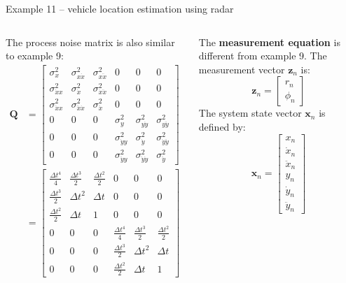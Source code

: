 \begin{frame}{Example 11 – vehicle location estimation using radar}
\begin{columns}
The process noise matrix is also similar to example 9:
\begin{align*}
\mathbf{Q} & =
\begin{bmatrix}
\sigma^2_{x} & \sigma^2_{x\dot{x}} & \sigma^2_{x\ddot{x}} & 0 & 0 & 0 \\
\sigma^2_{\dot{x}x} & \sigma^2_{\dot{x}} & \sigma^2_{\dot{x}\ddot{x}} & 0 & 0 & 0 \\
\sigma^2_{\ddot{x}x} & \sigma^2_{\ddot{x}\dot{x}} & \sigma^2_{\ddot{x}} & 0 & 0 & 0 \\
0 & 0 & 0 & \sigma^2_{y} & \sigma^2_{y\dot{y}} & \sigma^2_{y\ddot{y}} \\
0 & 0 & 0 & \sigma^2_{\dot{y}y} & \sigma^2_{\dot{y}} & \sigma^2_{\dot{y}\ddot{y}} \\
0 & 0 & 0 & \sigma^2_{\ddot{y}y} & \sigma^2_{\ddot{y}\dot{y}} & \sigma^2_{\ddot{y}}
\end{bmatrix}\\
& =
\begin{bmatrix}
\frac{\Delta t^4}{4} & \frac{\Delta t^3}{2} & \frac{\Delta t^2}{2} & 0 & 0 & 0 \\
\frac{\Delta t^3}{2} & \Delta t^2 & \Delta t & 0 & 0 & 0 \\
\frac{\Delta t^2}{2} & \Delta t & 1 & 0 & 0 & 0 \\
0 & 0 & 0 & \frac{\Delta t^4}{4} & \frac{\Delta t^3}{2} & \frac{\Delta t^2}{2} \\
0 & 0 & 0 & \frac{\Delta t^3}{2} & \Delta t^2 & \Delta t \\
0 & 0 & 0 & \frac{\Delta t^2}{2} & \Delta t & 1
\end{bmatrix}
\end{align*}


The \textbf{measurement equation} is different from example 9. The measurement vector \( \mathbf{z}_n \) is:
\[
\mathbf{z}_n =
\begin{bmatrix}
r_n \\
\phi_n
\end{bmatrix}
\]
The system state vector \( \mathbf{x}_n \) is defined by:
\[
\mathbf{x}_n =
\begin{bmatrix}
x_n \\
\dot{x}_n \\
\ddot{x}_n \\
y_n \\
\dot{y}_n \\
\ddot{y}_n
\end{bmatrix}
\]


\end{columns}
\end{frame}
